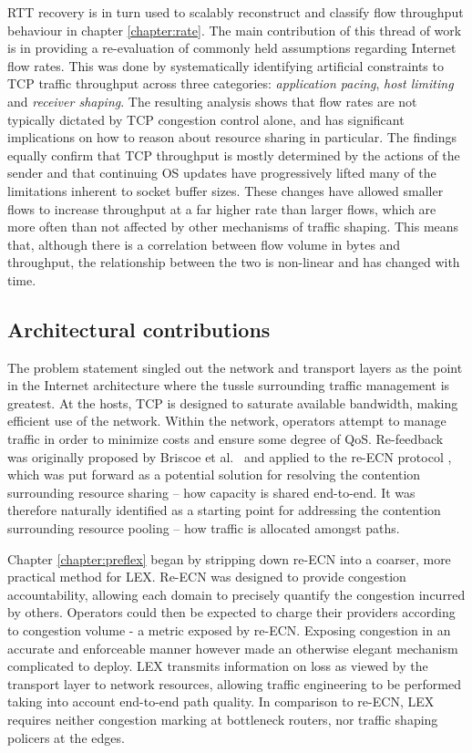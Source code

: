 \ac{RTT} recovery is in turn used to scalably reconstruct and classify flow throughput behaviour in chapter \ref{chapter:rate}.
The main contribution of this thread of work is in providing a re-evaluation of commonly held assumptions regarding Internet flow rates.
This was done by systematically identifying artificial constraints to \ac{TCP} traffic throughput across three categories: \emph{application pacing}, \emph{host limiting} and \emph{receiver shaping}. 
The resulting analysis shows that flow rates are not typically dictated by \ac{TCP} congestion control alone, and has significant implications on how to reason about resource sharing in particular.
The findings equally confirm that \ac{TCP} throughput is mostly determined by the actions of the sender and that continuing \acl{OS} updates have progressively lifted many of the limitations inherent to socket buffer sizes. 
These changes have allowed smaller flows to increase throughput at a far higher rate than larger flows, which are more often than not affected by other mechanisms of traffic shaping.
This means that, although there is a correlation between flow volume in bytes and throughput, the relationship between the two is non-linear and has changed with time.

\subsection{Architectural contributions}

The problem statement singled out the network and transport layers as the point in the Internet architecture where the tussle surrounding traffic management is greatest.
At the hosts, \ac{TCP} is designed to saturate available bandwidth, making efficient use of the network.
Within the network, operators attempt to manage traffic in order to minimize costs and ensure some degree of \ac{QoS}.
Re-feedback was originally proposed by Briscoe et al.\ \cite{Briscoe:2005p346} and applied to the re-\ac{ECN} protocol \cite{}, which was put forward as a potential solution for resolving the contention surrounding resource sharing -- how capacity is shared end-to-end.
It was therefore naturally identified as a starting point for addressing the contention surrounding resource pooling -- how traffic is allocated amongst paths.

Chapter \ref{chapter:preflex} began by stripping down re-\ac{ECN} into a coarser, more practical method for \acf{LEX}.
Re-\ac{ECN} was designed to provide congestion accountability, allowing each domain to precisely quantify the congestion incurred by others.
Operators could then be expected to charge their providers according to congestion volume - a metric exposed by re-\ac{ECN}.
Exposing congestion in an accurate and enforceable manner however made an otherwise elegant mechanism complicated to deploy.
\ac{LEX} transmits information on loss as viewed by the transport layer to network resources, allowing traffic engineering to be performed taking into account end-to-end path quality.
In comparison to re-\ac{ECN}, \ac{LEX} requires neither congestion marking at bottleneck routers, nor traffic shaping policers at the edges.

